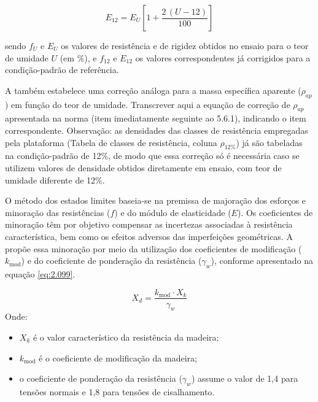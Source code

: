 \begin{equation}
E_{12} = E_U \left[1 + \frac{2\,(U - 12)}{100}\right]
\label{eq:corr_rigidez}
\end{equation}

sendo $f_U$ e $E_U$ os valores de resistência e de rigidez obtidos no ensaio para o teor de umidade $U$ (em \%), e $f_{12}$ e $E_{12}$ os valores correspondentes já corrigidos para a condição-padrão de referência.

\begin{fillblock}
A \textcite{NBR7190-1:2022} também estabelece uma correção análoga para a massa específica aparente ($\rho_{ap}$) em função do teor de umidade. Transcrever aqui a equação de correção de $\rho_{ap}$ apresentada na norma (item imediatamente seguinte ao 5.6.1), indicando o item correspondente. Observação: as densidades das classes de resistência empregadas pela plataforma (Tabela de classes de resistência, coluna $\rho_{12\%}$) já são tabeladas na condição-padrão de 12\%, de modo que essa correção só é necessária caso se utilizem valores de densidade obtidos diretamente em ensaio, com teor de umidade diferente de 12\%.
\end{fillblock}

O método dos estados limites baseia-se na premissa de majoração dos esforços e minoração das resistências ($f$) e do módulo de elasticidade ($E$).
Os coeficientes de minoração têm por objetivo compensar as incertezas associadas à resistência característica, bem como os efeitos adversos das imperfeições geométricas.
A \textcite{NBR7190-1:2022} propõe essa minoração por meio da utilização dos coeficientes de modificação ($k_{\mathrm{mod}}$) e do coeficiente de ponderação da resistência ($\gamma_w$), conforme apresentado na equação \ref{eq:2.099}.

\begin{equation}
    X_d = \frac{k_{\mathrm{mod}} \cdot X_k}{\gamma_w}
\label{eq:2.099}
\end{equation}
Onde:
\begin{itemize}
    \item $X_k$ é o valor característico da resistência da madeira;
    \item $k_{\mathrm{mod}}$ é o coeficiente de modificação da madeira;
    \item o coeficiente de ponderação da resistência ($\gamma_w$) assume o valor de 1{,}4 para tensões normais e 1{,}8 para tensões de cisalhamento.
\end{itemize}

